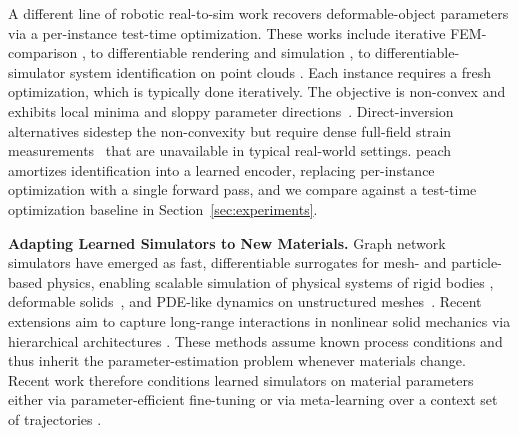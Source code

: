 A different line of robotic real-to-sim work recovers deformable-object parameters via a per-instance test-time optimization.
These works include iterative FEM-comparison \citep{frank10}, to differentiable rendering and simulation \citep{diffcloud22}, to differentiable-simulator system identification on point clouds \citep{yang2025differentiable, adaptigraph24}.
Each instance requires a fresh optimization, which is typically done iteratively. 
The objective is non-convex and exhibits local minima and sloppy parameter directions~\citep{transtrum2010nonlinear, zhang2022parameter}. 
Direct-inversion alternatives sidestep the non-convexity but require dense full-field strain measurements~\citep{avril2008overview} that are unavailable in typical real-world settings.
\gls{peach} amortizes identification into a learned encoder, replacing per-instance optimization with a single forward pass, and we compare against a test-time optimization baseline in Section~\ref{sec:experiments}.





\textbf{Adapting Learned Simulators to New Materials.}
Graph network simulators have emerged as fast, differentiable surrogates for mesh- and particle-based physics, enabling scalable simulation of physical systems of rigid bodies \citep{battaglia2016interaction, sanchezgonzalez2020learning}, deformable solids~\citep{pfaff2020learning}, and PDE-like dynamics on unstructured meshes~\citep{brandstetter2021message}. 
Recent extensions aim to capture long-range interactions in nonlinear solid mechanics via hierarchical architectures \citep{yu2024learning, freymuth2025amber, wurth2025diffusion}.
These methods assume known process conditions and thus inherit the parameter-estimation problem whenever materials change.
Recent work therefore conditions learned simulators on material parameters either via parameter-efficient fine-tuning \citep{manoharan2025parameter} or via meta-learning over a context set of trajectories \citep{chakrabarty2025meta, dahlinger2025context}.

